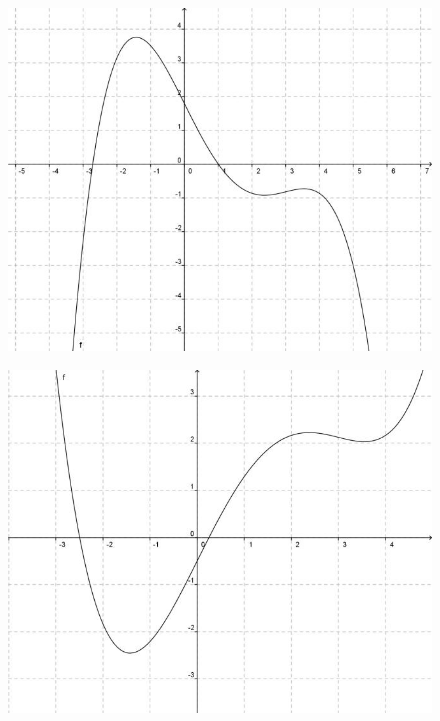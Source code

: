 \documentclass[a4paper,12pt]{article}
\begin{document}
\begin{enumerate}[label={\alph*)}]
\begin{minipage}[t]{0.5\textwidth}
  \begin{figure}[H]
    \vspace{0cm}
    \centering
    \includegraphics[width=0.8\linewidth]{Q12_SA_240103_2.jpg}
  \end{figure}
\end{minipage}
\begin{minipage}[t]{0.5\textwidth}
  \begin{figure}[H]
    \vspace{0cm}
    \centering
    \includegraphics[width=0.8\linewidth]{Q12_SA_240103_3.jpg}
  \end{figure}
\end{minipage}


\end{enumerate}
\end{document}
